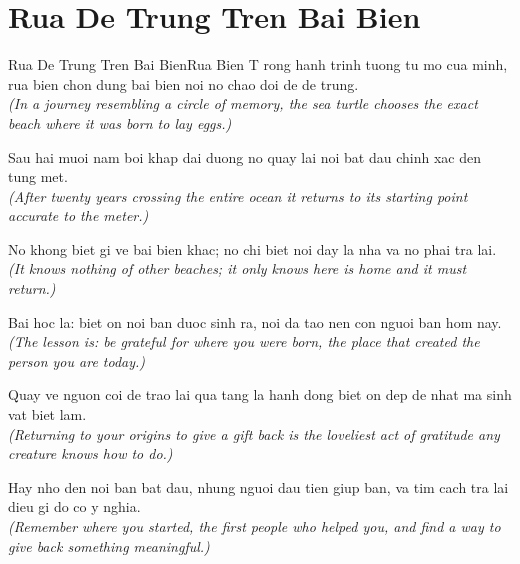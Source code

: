 \section{Rua De Trung Tren Bai Bien}
\begin{truyen}{Rua De Trung Tren Bai Bien}{Rua Bien}
T rong hanh trinh tuong tu mo cua minh, rua bien chon dung bai bien noi no chao doi de de trung.\\
\textit{(In a journey resembling a circle of memory, the sea turtle chooses the exact beach where it was born to lay eggs.)}

Sau hai muoi nam boi khap dai duong no quay lai noi bat dau chinh xac den tung met.\\
\textit{(After twenty years crossing the entire ocean it returns to its starting point accurate to the meter.)}

No khong biet gi ve bai bien khac; no chi biet noi day la nha va no phai tra lai.\\
\textit{(It knows nothing of other beaches; it only knows here is home and it must return.)}

Bai hoc la: biet on noi ban duoc sinh ra, noi da tao nen con nguoi ban hom nay.\\
\textit{(The lesson is: be grateful for where you were born, the place that created the person you are today.)}

Quay ve nguon coi de trao lai qua tang la hanh dong biet on dep de nhat ma sinh vat biet lam.\\
\textit{(Returning to your origins to give a gift back is the loveliest act of gratitude any creature knows how to do.)}

\end{truyen}
\begin{baihoc}
  Hay nho den noi ban bat dau, nhung nguoi dau tien giup ban, va tim cach tra lai dieu gi do co y nghia.\\
  \textit{(Remember where you started, the first people who helped you, and find a way to give back something meaningful.)}
\end{baihoc}
